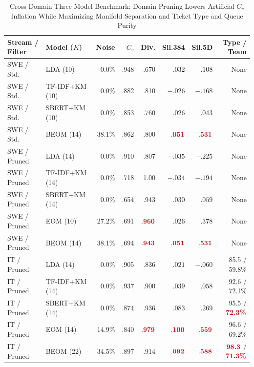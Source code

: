 \documentclass[sigconf,anonymous,pbalance]{acmart}
\newcommand{\hl}[1]{\textcolor{hlred}{\mathbf{#1}}}
\newcommand{\hlt}[1]{\textcolor{hlred}{\textbf{#1}}}
\begin{document}
\begin{table}[!htbp]
  \caption{Cross Domain Three Model Benchmark: Domain Pruning Lowers Artificial $C_v$ Inflation While Maximizing Manifold Separation and Ticket Type and Queue Purity}
  \label{tab:exp1}
  \footnotesize
  \setlength{\tabcolsep}{1.8pt}
  \begin{tabular}{llrrrrrr}
    \toprule
    Stream / Filter & Model ($K$) & Noise & $C_v$ & Div. & Sil.384 & Sil.5D & Type / Team \\
    \midrule
    SWE / Std. & LDA (10) & 0.0\% & .948 & .670 & $-.032$ & $-.108$ & None \\
    SWE / Std. & TF-IDF+KM (10) & 0.0\% & .882 & .810 & $-.026$ & $-.168$ & None \\
    SWE / Std. & SBERT+KM (10) & 0.0\% & .853 & .760 & $.026$ & $.043$ & None \\
    SWE / Std. & BEOM (14) & 38.1\% & .862 & .800 & $\hl{.051}$ & $\hl{.531}$ & None \\
    \midrule
    SWE / Pruned & LDA (14) & 0.0\% & .910 & .807 & $-.035$ & $-.225$ & None \\
    SWE / Pruned & TF-IDF+KM (14) & 0.0\% & .718 & 1.00 & $-.034$ & $-.194$ & None \\
    SWE / Pruned & SBERT+KM (14) & 0.0\% & .654 & .943 & $.030$ & $.059$ & None \\
    SWE / Pruned & EOM (10) & 27.2\% & .691 & $\hl{.960}$ & $.026$ & $.378$ & None \\
    SWE / Pruned & BEOM (14) & 38.1\% & .694 & $\hl{.943}$ & $\hl{.051}$ & $\hl{.531}$ & None \\
    \midrule
    IT / Pruned & LDA (14) & 0.0\% & .905 & .836 & $.021$ & $-.060$ & 85.5 / 59.8\% \\
    IT / Pruned & TF-IDF+KM (14) & 0.0\% & .937 & .900 & $.039$ & $.058$ & 92.6 / 72.1\% \\
    IT / Pruned & SBERT+KM (14) & 0.0\% & .874 & .936 & $.083$ & $.269$ & 95.5 / $\hlt{72.3\%}$ \\
    IT / Pruned & EOM (14) & 14.9\% & .840 & $\hl{.979}$ & $\hl{.100}$ & $\hl{.559}$ & 96.6 / 69.2\% \\
    IT / Pruned & BEOM (22) & 34.5\% & .897 & .914 & $\hl{.092}$ & $\hl{.588}$ & $\hlt{98.3}$ / $\hlt{71.3\%}$ \\
    \bottomrule
  \end{tabular}
\end{table}
\end{document}

